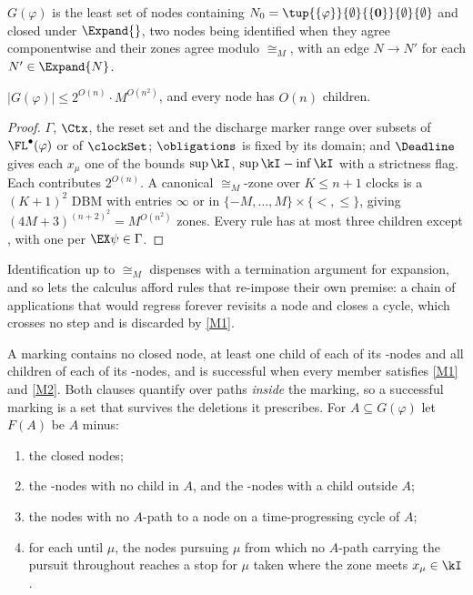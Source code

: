 \begin{definition}\label{def:graph}
$G(\varphi)$ is the least set of nodes containing $N_0=\tup{\{\varphi\}}{\emptyset}{\{\mathbf
0\}}{\emptyset}{\emptyset}$ and closed under $\Expand{}$, two nodes being identified when they agree
componentwise and their zones agree modulo $\cong_M$, with an edge $N\to N'$ for each
$N'\in\Expand{N}$.
\end{definition}

\begin{lemma}[Finiteness]\label{lem:finiteness}
$|G(\varphi)|\le 2^{O(n)}\cdot M^{O(n^{2})}$, and every node has $O(n)$ children.
\end{lemma}
\begin{proof}
$\Gamma$, $\Ctx$, the reset set and the discharge marker range over subsets of
$\FL^{\bullet}(\varphi)$ or of $\clockSet$; $\obligations$ is fixed by its domain; and $\Deadline$ gives each
$x_\mu$ one of the bounds $\sup\kI$, $\sup\kI-\inf\kI$ with a strictness flag. Each contributes
$2^{O(n)}$. A canonical $\cong_M$-zone over $K\le n+1$ clocks is a $(K{+}1)^{2}$ DBM with entries
$\infty$ or in $\{-M,\dots,M\}\times\{<,\le\}$, giving $(4M{+}3)^{(n+2)^{2}}=M^{O(n^{2})}$ zones.
Every rule has at most three children except , with one per $\EX\psi\in\Gamma$.
\end{proof}

\noindent
Identification up to $\cong_M$ dispenses with a termination argument for expansion, and so lets the
calculus afford rules that re-impose their own premise: a chain of applications that would regress
forever revisits a node and closes a cycle, which crosses no  step and is discarded by
\ref{M1}.

A marking contains no closed node, at least one child of each of its \ORn-nodes and all children of
each of its \ANDn-nodes, and is successful when every member satisfies \ref{M1} and \ref{M2}. Both
clauses quantify over paths \emph{inside} the marking, so a successful marking is a set that survives
the deletions it prescribes. For $A\subseteq G(\varphi)$ let $F(A)$ be $A$ minus:
\begin{enumerate}[start=1,label={D\arabic*)}, itemindent=1.6em, ref=(D\arabic*), itemsep=0.02em]
\item\label{D1} the closed nodes;
\item\label{D2} the \ORn-nodes with no child in $A$, and the \ANDn-nodes with a child outside $A$;
\item\label{D3} the nodes with no $A$-path to a node on a time-progressing cycle of $A$;
\item\label{D4} for each until $\mu$, the nodes pursuing $\mu$ from which no $A$-path carrying the
      pursuit throughout reaches a stop for $\mu$ taken where the zone meets $x_\mu\in\kI$.
\end{enumerate}

